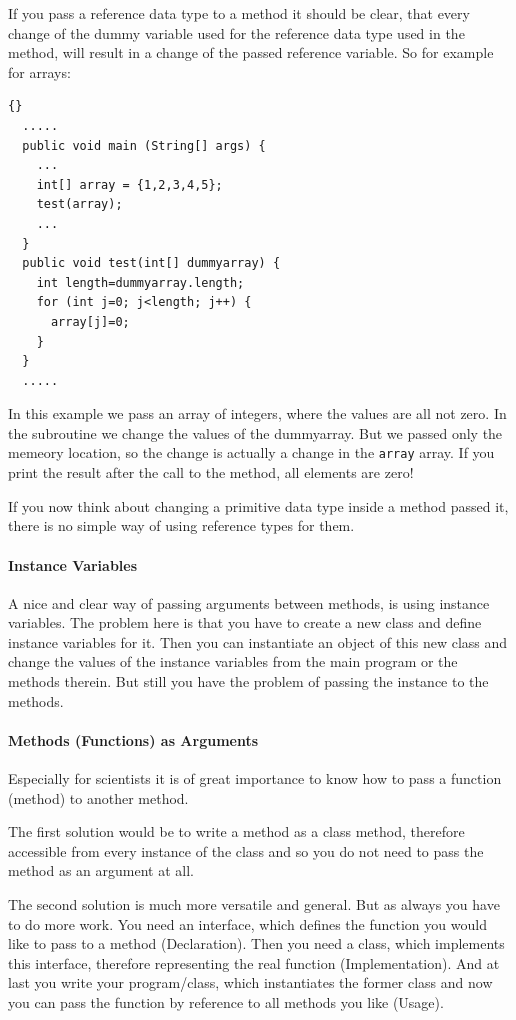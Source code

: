 If you pass a reference data type to a method it should be
clear, that every change of the dummy variable used for
the reference data type used in the method, will result in a change
of the passed reference variable. So for example for arrays:
\begin{lstlisting}{}
  .....
  public void main (String[] args) {
    ...
    int[] array = {1,2,3,4,5};
    test(array);
    ...
  }
  public void test(int[] dummyarray) {
    int length=dummyarray.length;
    for (int j=0; j<length; j++) {
      array[j]=0;
    }
  }
  .....
\end{lstlisting}
In this example we pass an array of integers, where the values are all 
not zero. In the subroutine we change the values of the dummyarray.
But we passed only the memeory location, so the change is actually
a change in the \verb|array| array. If you print the result after
the call to the method, all elements are zero!

If you now think about changing a primitive data type inside a method 
passed it, there is no simple way of using reference types for 
them. 

\paragraph{Instance Variables}
A nice and clear way of passing arguments between methods, is
using instance variables. The problem here is that you have
to create a new class and define instance variables for it.
Then you can instantiate an object of this new class and
change the values of the instance variables from the main
program or the methods therein. But still you have the problem
of passing the instance to the methods.

\paragraph{Methods (Functions) as Arguments} 
Especially for scientists it is of great importance to know how
to pass a function (method) to another method.

The first solution would be to write a method as a class method,
therefore accessible from every instance of the class and
so you do not need to pass the method as an argument at all.

The second solution is much more versatile and general.
But as always you have to do more work. You need an interface,
which defines the function you would like to pass to a method
(Declaration). Then you need a class, which implements this
interface, therefore representing the real function (Implementation).
And at last you write your program/class, which instantiates
the former class and now you can pass the function by reference
to all methods you like (Usage).  

